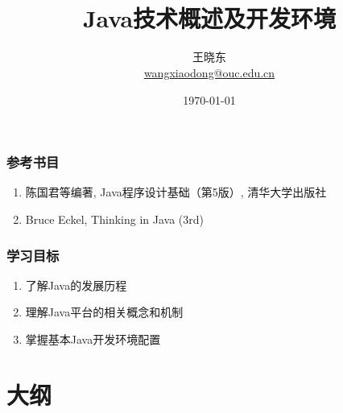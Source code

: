 
\title[Wang Xiaodong]{\\  
  Java技术概述及开发环境}
\author[王晓东]{王晓东\\
  \href{mailto:wangxiaodong@ouc.edu.cn}{\footnotesize wangxiaodong@ouc.edu.cn}}
\date{\today}


 \frame{\titlepage}

\begin{frame}
\frametitle{参考书目}
\begin{enumerate}
\item 陈国君等编著, Java程序设计基础（第5版）, 清华大学出版社
\item Bruce Eckel, Thinking in Java (3rd)
\end{enumerate}  
\end{frame}

\begin{frame}
\frametitle{学习目标}
\begin{enumerate}
\item 了解Java的发展历程
\item 理解Java平台的相关概念和机制
\item 掌握基本Java开发环境配置
\end{enumerate}  
\end{frame}

\section*{大纲}

